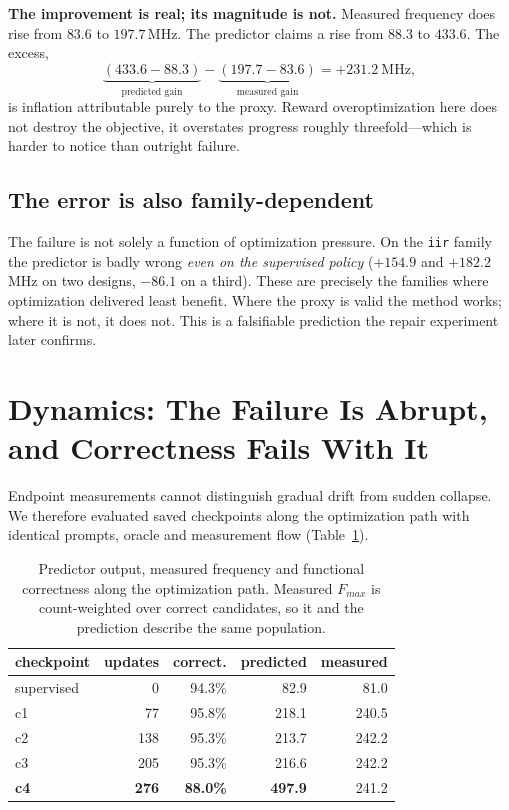 \documentclass[journal]{IEEEtran}
\newcommand{\fmax}{$F_{\mathit{max}}$}
\begin{document}
\textbf{The improvement is real; its magnitude is not.} Measured frequency does
rise from $83.6$ to $197.7$\,MHz. The predictor claims a rise from $88.3$ to
$433.6$. The excess,
\begin{equation}
\underbrace{(433.6-88.3)}_{\text{predicted gain}} -
\underbrace{(197.7-83.6)}_{\text{measured gain}} = +231.2~\text{MHz},
\end{equation}
is inflation attributable purely to the proxy. Reward overoptimization here does
not destroy the objective, it overstates progress roughly threefold---which is
harder to notice than outright failure.

\subsection{The error is also family-dependent}

The failure is not solely a function of optimization pressure. On the
\texttt{iir} family the predictor is badly wrong \emph{even on the supervised
policy} ($+154.9$ and $+182.2$\,MHz on two designs, $-86.1$ on a third). These
are precisely the families where optimization delivered least benefit. Where the
proxy is valid the method works; where it is not, it does not. This is a
falsifiable prediction the repair experiment later confirms.

\section{Dynamics: The Failure Is Abrupt, and Correctness Fails With It}
\label{sec:trajectory}

Endpoint measurements cannot distinguish gradual drift from sudden collapse. We
therefore evaluated saved checkpoints along the optimization path with identical
prompts, oracle and measurement flow (Table~\ref{tab:trajectory}).

\begin{table}[t]
\caption{Predictor output, measured frequency and functional correctness along
the optimization path. Measured \fmax{} is count-weighted over correct
candidates, so it and the prediction describe the same population.}
\label{tab:trajectory}
\centering
\small
\begin{tabular}{lrrrr}
\toprule
checkpoint & updates & correct. & predicted & measured \\
\midrule
supervised & 0   & 94.3\% &  82.9 & 81.0 \\
c1         & 77  & 95.8\% & 218.1 & 240.5 \\
c2         & 138 & 95.3\% & 213.7 & 242.2 \\
c3         & 205 & 95.3\% & 216.6 & 242.2 \\
\textbf{c4} & \textbf{276} & \textbf{88.0\%} & \textbf{497.9} & 241.2 \\
\bottomrule
\end{tabular}
\end{table}
\end{document}
